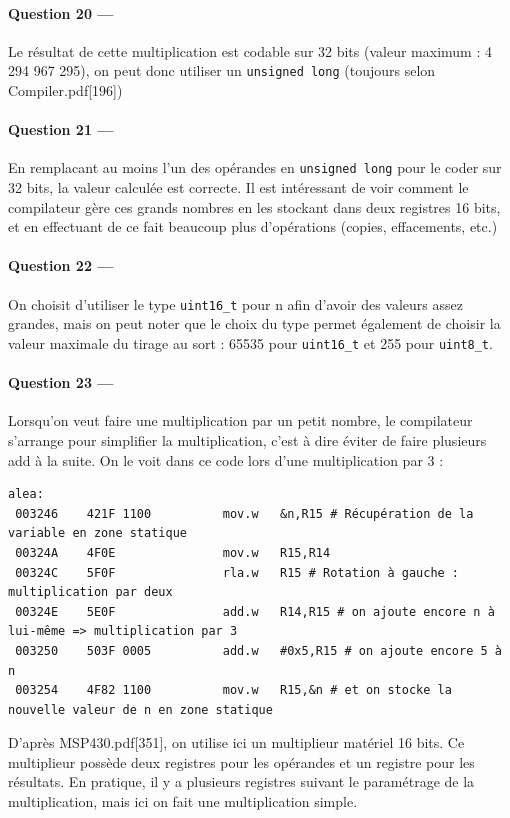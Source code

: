 \documentclass[a4paper,11pt,article]{memoir}
\begin{document}
\paragraph{Question 20 ---}  Le résultat de cette multiplication est codable sur 32 bits (valeur maximum : 4 294 967 295), on peut donc utiliser un \verb|unsigned long| (toujours selon Compiler.pdf[196])

\paragraph{Question 21 ---}  En remplacant au moins l'un des opérandes en \verb|unsigned long| pour le coder sur 32 bits, la valeur calculée est correcte. Il est intéressant de voir comment le compilateur gère ces grands nombres en les stockant dans deux registres 16 bits, et en effectuant de ce fait beaucoup plus d'opérations (copies, effacements, etc.)

\paragraph{Question 22 ---}  On choisit d'utiliser le type \verb|uint16_t| pour n afin d'avoir des valeurs assez grandes, mais on peut noter que le choix du type permet également de choisir la valeur maximale du tirage au sort : 65535 pour \verb|uint16_t| et 255 pour \verb|uint8_t|.

\paragraph{Question 23 ---}  Lorsqu'on veut faire une multiplication par un petit nombre, le compilateur s'arrange pour simplifier la multiplication, c'est à dire éviter de faire plusieurs add à la suite. On le voit dans ce code lors d'une multiplication par 3 :

\begin{verbatim}
alea:
 003246    421F 1100          mov.w   &n,R15 # Récupération de la variable en zone statique
 00324A    4F0E               mov.w   R15,R14
 00324C    5F0F               rla.w   R15 # Rotation à gauche : multiplication par deux
 00324E    5E0F               add.w   R14,R15 # on ajoute encore n à lui-même => multiplication par 3
 003250    503F 0005          add.w   #0x5,R15 # on ajoute encore 5 à n
 003254    4F82 1100          mov.w   R15,&n # et on stocke la nouvelle valeur de n en zone statique
\end{verbatim}

D'après MSP430.pdf[351], on utilise ici un multiplieur matériel 16 bits. Ce multiplieur possède deux registres pour les opérandes et un registre pour les résultats. En pratique, il y a plusieurs registres suivant le paramétrage de la multiplication, mais ici on fait une multiplication simple.
\end{document}
